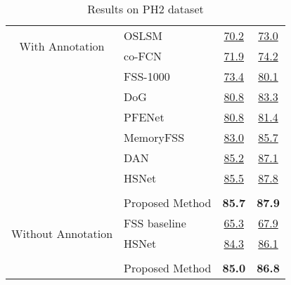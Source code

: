 \documentclass[runningheads]{llncs}
\begin{document}
\begin{table}[!htb]
\begin{subtable}[b]{0.54\textwidth}
{\begin{tabular}{cl|cc}
				\midrule
				\multirow{2}{*}{With Annotation}      
                    & OSLSM~\cite{shaban2017one} & \underline{70.2} & \underline{73.0} \\
                    & co-FCN~\cite{rakelly2018conditional} & \underline{71.9} & \underline{74.2} \\
                    & FSS-1000~\cite{li2020fss} & \underline{73.4}& \underline{80.1} \\
                    & DoG~\cite{azad2021texture} & \underline{80.8} & \underline{83.3} \\
                    & PFENet~\cite{tian2020prior} & \underline{80.8} & \underline{81.4} \\
                    & MemoryFSS~\cite{lu2021learning} & \underline{83.0} & \underline{85.7} \\
                    & DAN~\cite{wang2020few} & \underline{85.2} & \underline{87.1} \\  & HSNet~\cite{min2021hypercorrelation} & \underline{85.5} & \underline{87.8} \\ \cline{2-4} \\[-2.0ex]
				\rowcolor[rgb]{0.682,0.859,0.855}
				& Proposed Method  & \textbf{85.7} & \textbf{87.9} \\
				\midrule
				\multirow{2}{*}{Without Annotation} & FSS baseline~\cite{feyjie2020semi} & \underline{65.3} & \underline{67.9} \\  & HSNet~\cite{min2021hypercorrelation} & \underline{84.3} & \underline{86.1} \\ \cline{2-4} \\[-2.0ex]
				\rowcolor[rgb]{0.682,0.859,0.855}
				& Proposed Method  & \textbf{85.0} & \textbf{86.8} \\				
				\bottomrule
			\end{tabular}
		}
	\end{subtable}
	\hfill
	\begin{subtable}[c]{0.40\textwidth}
		\caption{Results on PH2 dataset} \label{tab:results2}
        \centering
\end{subtable}
\end{table}
\end{document}
